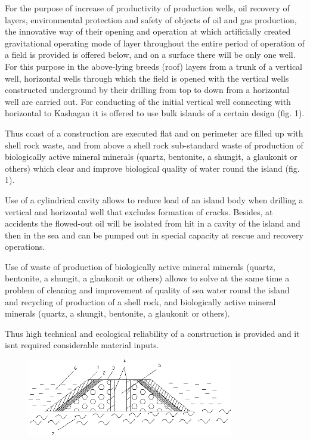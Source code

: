 For the purpose of increase of productivity of production wells, oil
recovery of layers, environmental protection and safety of objects of
oil and gas production, the innovative way of their opening and
operation at which artificially created gravitational operating mode of
layer throughout the entire period of operation of a field is provided
is offered below, and on a surface there will be only one well. For this
purpose in the above-lying breeds (roof) layers from a trunk of a
vertical well, horizontal wells through which the field is opened with
the vertical wells constructed underground by their drilling from top to
down from a horizontal well are carried out. For conducting of the
initial vertical well connecting with horizontal to Kashagan it is
offered to use bulk islands of a certain design (fig. 1).

Thus coast of a construction are executed flat and on perimeter are
filled up with shell rock waste, and from above a shell rock
sub-standard waste of production of biologically active mineral minerals
(quartz, bentonite, a shungit, a glaukonit or others) which clear and
improve biological quality of water round the island (fig. 1).

Use of a cylindrical cavity allows to reduce load of an island body when
drilling a vertical and horizontal well that excludes formation of
cracks. Besides, at accidents the flowed-out oil will be isolated from
hit in a cavity of the island and then in the sea and can be pumped out
in special capacity at rescue and recovery operations.

Use of waste of production of biologically active mineral minerals
(quartz, bentonite, a shungit, a glaukonit or others) allows to solve at
the same time a problem of cleaning and improvement of quality of sea
water round the island and recycling of production of a shell rock, and
biologically active mineral minerals (quartz, a shungit, bentonite, a
glaukonit or others).

Thus high technical and ecological reliability of a construction is
provided and it isn\textquotesingle t required considerable material
inputs.

\begin{figure}[H]
	\centering
	\includegraphics[width=0.8\textwidth]{assets/1339}
	\caption*{}
\end{figure}

